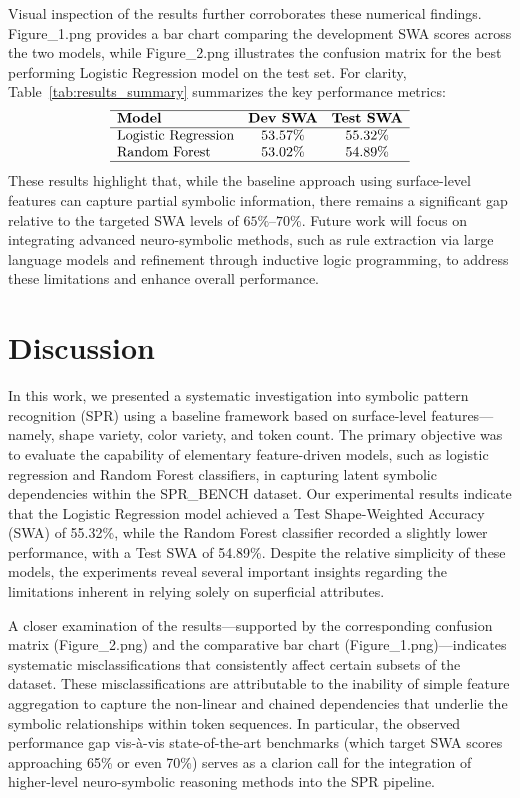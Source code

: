 \documentclass{article}
\begin{document}
Visual inspection of the results further corroborates these numerical findings. Figure\_1.png provides a bar chart comparing the development SWA scores across the two models, while Figure\_2.png illustrates the confusion matrix for the best performing Logistic Regression model on the test set. For clarity, Table~\ref{tab:results_summary} summarizes the key performance metrics:
\[
\begin{array}{lcc}
\hline
\textbf{Model} & \textbf{Dev SWA} & \textbf{Test SWA} \\
\hline
\text{Logistic Regression} & 53.57\% & 55.32\% \\
\text{Random Forest} & 53.02\% & 54.89\% \\
\hline
\end{array}
\]
These results highlight that, while the baseline approach using surface-level features can capture partial symbolic information, there remains a significant gap relative to the targeted SWA levels of \(65\%\)–\(70\%\). Future work will focus on integrating advanced neuro-symbolic methods, such as rule extraction via large language models and refinement through inductive logic programming, to address these limitations and enhance overall performance.

\section{Discussion}
In this work, we presented a systematic investigation into symbolic pattern recognition (SPR) using a baseline framework based on surface-level features—namely, shape variety, color variety, and token count. The primary objective was to evaluate the capability of elementary feature-driven models, such as logistic regression and Random Forest classifiers, in capturing latent symbolic dependencies within the SPR\_BENCH dataset. Our experimental results indicate that the Logistic Regression model achieved a Test Shape-Weighted Accuracy (SWA) of 55.32\%, while the Random Forest classifier recorded a slightly lower performance, with a Test SWA of 54.89\%. Despite the relative simplicity of these models, the experiments reveal several important insights regarding the limitations inherent in relying solely on superficial attributes.

A closer examination of the results—supported by the corresponding confusion matrix (Figure\_2.png) and the comparative bar chart (Figure\_1.png)—indicates systematic misclassifications that consistently affect certain subsets of the dataset. These misclassifications are attributable to the inability of simple feature aggregation to capture the non-linear and chained dependencies that underlie the symbolic relationships within token sequences. In particular, the observed performance gap vis-\`a-vis state-of-the-art benchmarks (which target SWA scores approaching 65\% or even 70\%) serves as a clarion call for the integration of higher-level neuro-symbolic reasoning methods into the SPR pipeline.
\end{document}
